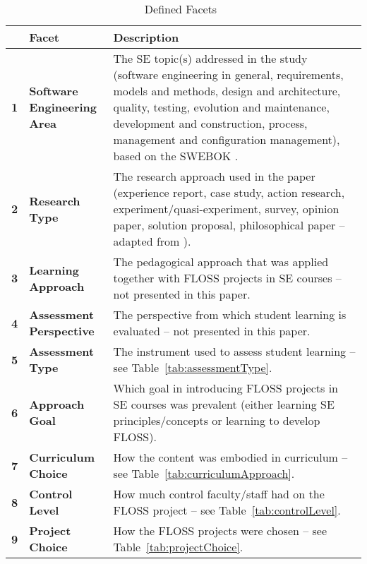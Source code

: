 \begin{table*}[tb]
	\centering
	\caption {Defined Facets~\cite{2015:CSE:nascimento}}  
		{\begin{tabular}{c|l|p{5in}} 
			 & \bf Facet & \bf Description \\
			\hline
			\bf 1 	& \small \bf Software Engineering Area 
            		& The SE topic(s) addressed in the study 
(software engineering in general, requirements, models and methods, design and architecture, quality, testing, evolution and maintenance, development and construction, process, management and configuration management), based on the SWEBOK \citeyearpar{swebok}. \\
			\bf 2 & \small \bf Research Type & The research approach used in the paper 
            	(experience report, case study, action research, experiment/quasi-experiment, survey, opinion paper, solution proposal, philosophical paper
            -- adapted from \citet{Petersen}). \\
			\bf 3 & \small \bf Learning Approach & The pedagogical approach 
            that was applied together with FLOSS projects in SE courses 
            -- not presented in this paper. \\
			\bf 4 & \small \bf Assessment Perspective & The perspective from which
            student learning is evaluated -- not presented in this paper. \\
			\bf 5 & \small \bf Assessment Type & The instrument used to assess student
            learning -- see Table~\ref{tab:assessmentType}. \\
			\bf 6 & \small \bf Approach Goal & Which goal in introducing FLOSS projects
            in SE courses was prevalent (either learning SE principles/concepts 
            or learning to develop FLOSS). \\
			\bf 7 & \small \bf Curriculum Choice & How the content was embodied in
            curriculum -- see Table~\ref{tab:curriculumApproach}. \\
			\bf 8 & \small \bf Control Level & How much control faculty/staff 
            had on the FLOSS project -- see Table~\ref{tab:controlLevel}. \\
			\bf 9 & \small \bf Project Choice & How the FLOSS projects were chosen  -- see Table~\ref{tab:projectChoice}. \\		
		\end{tabular}}
	\label{tab:facets}
\end{table*}
